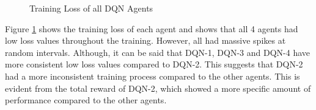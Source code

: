 \begin{figure}[H]
    \centering
    \caption{Training Loss of all DQN Agents}
    \label{fig:DQN_training_loss}
\end{figure}

Figure \ref{fig:DQN_training_loss} shows the training loss of each agent and shows that all 4 agents had low loss values throughout the training. However, all had massive spikes at random intervals. Although, it can be said that DQN-1, DQN-3 and DQN-4 have more consistent low loss values compared to DQN-2. This suggests that DQN-2 had a more inconsistent training process compared to the other agents. This is evident from the total reward of DQN-2, which showed a more specific amount of performance compared to the other agents.

